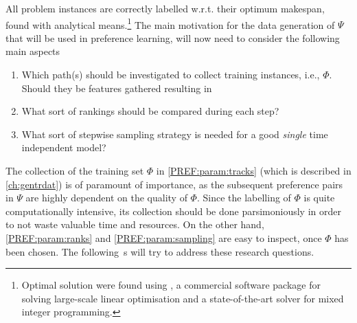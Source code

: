 All problem instances are correctly labelled w.r.t. their optimum makespan, 
found with analytical means.\footnote{Optimal solution were found using 
  \cite{gurobi}, a commercial software package for solving large-scale linear 
  optimisation and a state-of-the-art solver for mixed integer programming.} 
The main motivation for the data generation of $\Psi$ that will be used in 
preference learning, will now need to consider the following main aspects
\begin{enumerate}[after={{}}, leftmargin=*, label={\textbf{PREF.\arabic*}}, 
ref={{PREF.\arabic*}}]
    \item Which path(s) should be investigated to collect training instances, 
    i.e., $\Phi$. Should they be features gathered resulting in
    \label{PREF:param:tracks}
    \item What sort of rankings should be compared during each step?
    \label{PREF:param:ranks}
    \item What sort of stepwise sampling strategy is needed for a good
    \emph{single} time independent model?
    \label{PREF:param:sampling}
\end{enumerate}
The collection of the training set $\Phi$ in \ref{PREF:param:tracks} (which is 
described in \cref{ch:gentrdat}) is of paramount of importance, as the 
subsequent preference pairs in $\Psi$ are highly dependent on the quality of 
$\Phi$. 
Since the labelling of $\Phi$ is quite computationally intensive, its 
collection should be done parsimoniously in order to not waste valuable time 
and resources. 
On the other hand, \ref{PREF:param:ranks} and \ref{PREF:param:sampling} are 
easy to inspect, once $\Phi$ has been chosen.
The following s will try to address these 
research questions. 

